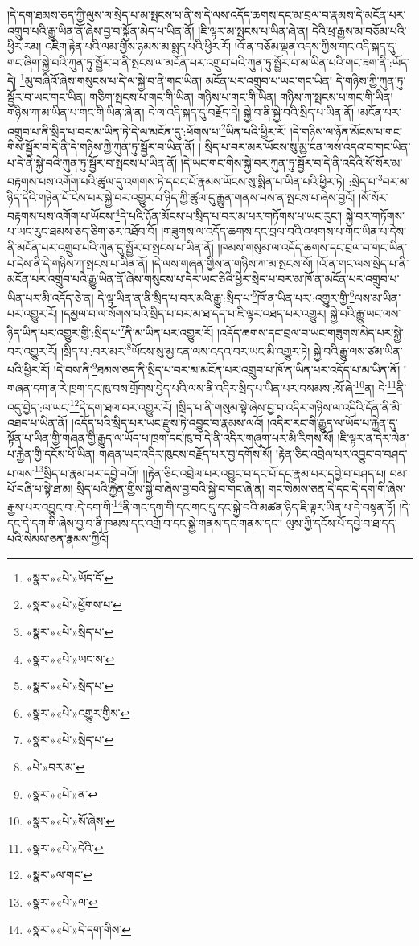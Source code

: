 །དེ་དག་ཐམས་ཅད་ཀྱི་ལུས་ལ་སྲེད་པ་མ་སྤངས་པ་ནི་ས་དེ་ལས་འདོད་ཆགས་དང་མ་བྲལ་བ་རྣམས་དེ་མངོན་པར་འགྲུབ་པའི་རྒྱུ་ཡིན་ནོ་ཞེས་བྱ་བ་སྐྱོན་མེད་པ་ཡིན་ནོ། །ཇི་ལྟར་མ་སྤངས་པ་ཡིན་ཞེ་ན། དེའི་ཕྲ་རྒྱས་མ་བཅོམ་པའི་ཕྱིར་རམ། འཇིག་རྟེན་པའི་ལམ་གྱིས་ཉམས་མ་སྨད་པའི་ཕྱིར་རོ། །འོ་ན་བཅོམ་ལྡན་འདས་ཀྱིས་གང་འདི་སྐད་དུ་གང་ཞིག་སྐྱེ་བའི་ཀུན་ཏུ་སྦྱོར་བ་ནི་སྤངས་ལ་མངོན་པར་འགྲུབ་པའི་ཀུན་ཏུ་སྦྱོར་བ་མ་ཡིན་པའི་གང་ཟག་ནི་:ཡོད་དེ། \footnote{«སྣར་»«པེ་»ཡོད་དོ་}མུ་བཞིའོ་ཞེས་གསུངས་པ་དེ་ལ་སྐྱེ་བ་ནི་གང་ཡིན། མངོན་པར་འགྲུབ་པ་ཡང་གང་ཡིན། དེ་གཉིས་ཀྱི་ཀུན་ཏུ་སྦྱོར་བ་ཡང་གང་ཡིན། གཅིག་སྤངས་པ་གང་གི་ཡིན། གཉིས་པ་གང་གི་ཡིན། གཉིས་ཀ་སྤངས་པ་གང་གི་ཡིན། གཉིས་ཀ་མ་ཡིན་པ་གང་གི་ཡིན་ཞེ་ན། དེ་ལ་འདི་སྐད་དུ་བརྗོད་དེ། སྐྱེ་བ་ནི་སྐྱེ་བའི་སྲིད་པ་ཡིན་ནོ། །མངོན་པར་འགྲུབ་པ་ནི་སྲིད་པ་བར་མ་ཡིན་ཏེ་དེ་ལ་མངོན་དུ་:ཕོགས་པ་\footnote{«སྣར་»«པེ་»ཕྱོགས་པ་}ཡིན་པའི་ཕྱིར་རོ། །དེ་གཉིས་ལ་ཉོན་མོངས་པ་གང་གིས་སྦྱོར་བ་དེ་ནི་དེ་གཉིས་ཀྱི་ཀུན་ཏུ་སྦྱོར་བ་ཡིན་ནོ། །
སྲིད་པ་བར་མར་ཡོངས་སུ་མྱ་ངན་ལས་འདའ་བ་གང་ཡིན་པ་དེ་ནི་སྐྱེ་བའི་ཀུན་ཏུ་སྦྱོར་བ་སྤངས་པ་ཡིན་ནོ། །དེ་ཡང་གང་གིས་སྐྱེ་བར་ཀུན་ཏུ་སྦྱོར་བ་དེ་ནི་འདིའི་སོ་སོར་མ་བརྟགས་པས་འགོག་པའི་ཚུལ་དུ་འགགས་ཏེ་དབང་པོ་རྣམས་ཡོངས་སུ་སྨིན་པ་ཡིན་པའི་ཕྱིར་ཏེ། :སྲེད་པ་\footnote{«སྣར་»«པེ་»སྲིད་པ་}བར་མ་ཉིད་དེའི་གཉེན་པོ་ངེས་པར་སྐྱེ་བར་འགྱུར་བ་ཉིད་ཀྱི་ཚུལ་དུ་རྒྱུན་གནས་པས་ན་སྤངས་པ་ཞེས་བྱའོ། །སོ་སོར་བརྟགས་པས་འགོག་པ་ཡོངས་\footnote{«སྣར་»«པེ་»ཡང་ས་}དེ་པའི་ཉོན་མོངས་པ་སྲིད་པ་བར་མ་པར་གཏོགས་པ་ཡང་རུང་། སྐྱེ་བར་གཏོགས་པ་ཡང་རུང་ཐམས་ཅད་ཅིག་ཅར་འཐོབ་བོ། །གཟུགས་ལ་འདོད་ཆགས་དང་བྲལ་བའི་འཕགས་པ་གང་ཡིན་པ་དེས་ནི་མངོན་པར་འགྲུབ་པའི་ཀུན་དུ་སྦྱོར་བ་སྤངས་པ་ཡིན་ནོ། །ཁམས་གསུམ་ལ་འདོད་ཆགས་དང་བྲལ་བ་གང་ཡིན་པ་དེས་ནི་དེ་གཉིས་ཀ་སྤངས་པ་ཡིན་ནོ། །དེ་ལས་གཞན་གྱིས་ན་གཉིས་ཀ་མ་སྤངས་སོ། །འོ་ན་གང་ལས་སྲེད་པ་ནི་མངོན་པར་འགྲུབ་པའི་རྒྱུ་ཡིན་ནོ་ཞེས་གསུངས་པ་དེར་ཡང་ཅིའི་ཕྱིར་སྲིད་པ་བར་མ་ཁོ་ན་མངོན་པར་འགྲུབ་པ་ཡིན་པར་མི་འདོད་ཅེ་ན། དེ་ལྟ་ཡིན་ན་ནི་སྲིད་པ་བར་མའི་རྒྱུ་:སྲིད་པ་\footnote{«སྣར་»«པེ་»སྲེད་པ་}ཁོ་ན་ཡིན་པར་:འགྱུར་གྱི་\footnote{«སྣར་»«པེ་»འགྱུར་གྱིས་}ལས་མ་ཡིན་པར་འགྱུར་རོ། །དམྱལ་བ་ལ་སོགས་པའི་སྲིད་པ་བར་མ་ཐ་དད་པ་ཇི་ལྟར་འཐད་པར་འགྱུར། སྐྱེ་བའི་རྒྱུ་ཡང་ལས་ཉིད་ཡིན་པར་འགྱུར་གྱི་:སྲིད་པ་\footnote{«སྣར་»«པེ་»སྲེད་པ་}ནི་མ་ཡིན་པར་འགྱུར་རོ། །འདོད་ཆགས་དང་བྲལ་བ་ཡང་གཟུགས་མེད་པར་སྐྱེ་བར་འགྱུར་རོ། །སྲིད་པ་:བར་མར་\footnote{«པེ་»བར་མ་}ཡོངས་སུ་མྱ་ངན་ལས་འདའ་བར་ཡང་མི་འགྱུར་ཏེ། སྐྱེ་བའི་རྒྱུ་ལས་ཙམ་ཡིན་པའི་ཕྱིར་རོ། །དེ་བས་ནི་\footnote{«སྣར་»«པེ་»ན་}ཐམས་ཅད་ནི་སྲིད་པ་བར་མ་མངོན་པར་འགྲུབ་པ་ཁོ་ན་ཡིན་པར་འདོད་པ་མ་ཡིན་ནོ། །གཞན་དག་ན་རེ་ཁྲག་དང་ཁུ་བས་གྲོགས་བྱེད་པའི་ལས་ནི་འདིར་སྲིད་པ་ཡིན་པར་བསམས་:སོ་ཞེ་\footnote{«སྣར་»«པེ་»སོ་ཞེས་}ན། དེ་\footnote{«སྣར་»«པེ་»དེའི་}ནི་འདུ་བྱེད་:ལ་ཡང་\footnote{«སྣར་»ལ་གང་}དེ་དག་ཐལ་བར་འགྱུར་རོ། །སྲིད་པ་ནི་གསུམ་སྟེ་ཞེས་བྱ་བ་འདིར་གཉིས་ལ་འདིའི་དོན་ནི་མི་འཐད་པ་ཡིན་ནོ། །འདོད་པའི་སྲིད་པར་ཡང་རྫུས་ཏེ་འབྱུང་བ་རྣམས་ལའོ། །འདིར་རང་གི་རྒྱུད་ལ་ཡོད་པ་རྐྱེན་དུ་སྟོན་པ་ཡིན་གྱི་གཞན་གྱི་རྒྱུད་ལ་ཡོད་པ་ཁྲག་དང་ཁུ་བ་དེ་ནི་འདིར་གཞུག་པར་མི་རིགས་སོ། །ཇི་ལྟར་ན་དེར་ལེན་པ་རྐྱེན་གྱི་དངོས་པོ་ཡིན། གཞན་ཡང་འདིར་ཁུངས་བརྗོད་པར་བྱ་དགོས་སོ། །རྟེན་ཅིང་འབྲེལ་པར་འབྱུང་བ་བཤད་པ་ལས་\footnote{«སྣར་»«པེ་»ལ་}སྲིད་པ་རྣམ་པར་དབྱེ་བའོ།། །།རྟེན་ཅིང་འབྲེལ་པར་འབྱུང་བ་དང་པོ་དང་རྣམ་པར་དབྱེ་བ་བཤད་པ། བམ་པོ་བཞི་པ་སྟེ་ཐ་མ། སྲིད་པའི་རྐྱེན་གྱིས་སྐྱེ་བ་ཞེས་བྱ་བའི་སྐྱེ་བ་གང་ཞེ་ན། གང་སེམས་ཅན་དེ་དང་དེ་དག་གི་ཞེས་རྒྱས་པར་འབྱུང་བ་:དེ་དག་གི་\footnote{«སྣར་»«པེ་»དེ་དག་གིས་}ནི་གང་དག་གི་དང་གང་དུ་དང་སྐྱེ་བའི་མཚན་ཉིད་ཇི་ལྟར་ཡིན་པ་དེ་བསྟན་ཏོ། །དེ་དང་དེ་དག་གི་ཞེས་བྱ་བ་ནི་ཁམས་དང་འགྲོ་བ་དང་སྐྱེ་གནས་དང་གནས་དང་། ལུས་ཀྱི་དངོས་པོ་དབྱེ་བ་ཐ་དད་པའི་སེམས་ཅན་རྣམས་ཀྱིའོ། 
